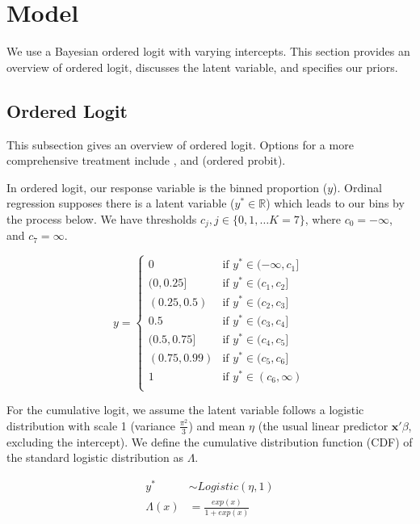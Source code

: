 \documentclass[11pt,twoside]{article}
\numberwithin{Theorem}{section}
\numberwithin{Definition}{section}
\numberwithin{Lemma}{section}
\numberwithin{Algorithm}{section}
\numberwithin{equation}{section}
\begin{document}
\newpage

\section{Model} \label{sec::Model}

We use a Bayesian ordered logit with varying intercepts. This section provides an overview of ordered logit, discusses the latent variable, and specifies our priors.

\subsection{Ordered Logit}

This subsection gives an overview of ordered logit. Options for a more comprehensive treatment include \cite{WalkerDuncan1967Logit, McCullagh1980}, and \cite{Greene2012} (ordered probit).

In ordered logit, our response variable is the binned proportion ($y$). Ordinal regression supposes there is a latent variable ($y^* \in \mathbb{R}$) which leads to our bins by the process below. We have thresholds $c_j, j \in \{0, 1, \dots K = 7\}$, where $c_0 = -\infty$, and $c_7 = \infty$. 

\[
y = 
\begin{cases}
0 & \text{if } y^*            \in (-\infty, c_1]\\
(0, 0.25] & \text{if } y^*    \in (c_1, c_2]\\
(0.25, 0.5) & \text{if } y^*  \in (c_2, c_3]\\
0.5 & \text{if } y^*          \in (c_3, c_4]\\
(0.5, 0.75] & \text{if } y^*  \in (c_4, c_5]\\
(0.75, 0.99) & \text{if } y^* \in (c_5, c_6]\\
1 & \text{if } y^*            \in (c_6, \infty)\\
\end{cases}
\]


For the cumulative logit, we assume the latent variable follows a logistic distribution with scale 1 (variance $\frac{\pi^2}{3}$) and mean $\eta$ (the usual linear predictor $\mathbf{x}'\beta$, excluding the intercept). We define the cumulative distribution function (CDF) of the standard logistic distribution as $\Lambda$. 

\begin{align*}
	y^* &\sim Logistic(\eta, 1) \\
	\Lambda(x) &= \frac{exp(x)}{1 + exp(x)}
\end{align*}
\end{document}
